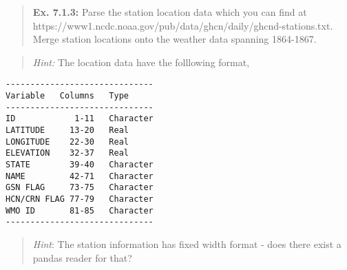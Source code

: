 \documentclass[11pt]{article}
\begin{document}
    \begin{quote}
\textbf{Ex. 7.1.3:} Parse the station location data which you can find
at https://www1.ncdc.noaa.gov/pub/data/ghcn/daily/ghcnd-stations.txt.
Merge station locations onto the weather data spanning 1864-1867.
\end{quote}

\begin{quote}
\emph{Hint:} The location data have the folllowing format,
\end{quote}

\begin{verbatim}
------------------------------
Variable   Columns   Type
------------------------------
ID            1-11   Character
LATITUDE     13-20   Real
LONGITUDE    22-30   Real
ELEVATION    32-37   Real
STATE        39-40   Character
NAME         42-71   Character
GSN FLAG     73-75   Character
HCN/CRN FLAG 77-79   Character
WMO ID       81-85   Character
------------------------------
\end{verbatim}

\begin{quote}
\emph{Hint}: The station information has fixed width format - does there
exist a pandas reader for that?
\end{quote}
\end{document}
